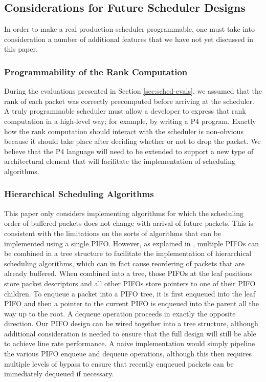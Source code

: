 \subsection{Considerations for Future Scheduler Designs}
In order to make a real production scheduler programmable, one must take into consideration a number of additional features that we have not yet discussed in this paper.

\subsubsection*{Programmability of the Rank Computation}
During the evaluations presented in Section \ref{sec:sched-evals}, we assumed that the rank of each packet was correctly precomputed before arriving at the scheduler. A truly programmable scheduler must allow a developer to express that rank computation in a high-level way; for example, by writing a P4 program. Exactly how the rank computation should interact with the scheduler is non-obvious because it should take place after deciding whether or not to drop the packet. We believe that the P4 language will need to be extended to support a new type of architectural element that will facilitate the implementation of scheduling algorithms.

\subsubsection*{Hierarchical Scheduling Algorithms}
This paper only considers implementing algorithms for which the scheduling order of buffered packets does not change with arrival of future packets. This is consistent with the limitations on the sorts of algorithms that can be implemented using a single PIFO. However, as explained in \cite{pifo2016}, multiple PIFOs can be combined in a tree structure to facilitate the implementation of hierarchical scheduling algorithms, which can in fact cause reordering of packets that are already buffered. When combined into a tree, those PIFOs at the leaf positions store packet descriptors and all other PIFOs store pointers to one of their PIFO children. To enqueue a packet into a PIFO tree, it is first enqueued into the leaf PIFO and then a pointer to the current PIFO is enqueued into the parent all the way up to the root. A dequeue operation proceeds in exactly the opposite direction. Our PIFO design can be wired together into a tree structure, although additional consideration is needed to ensure that the full design will still be able to achieve line rate performance. A naive implementation would simply pipeline the various PIFO enqueue and dequeue operations, although this then requires multiple levels of bypass to ensure that recently enqueued packets can be immediately dequeued if necessary.

